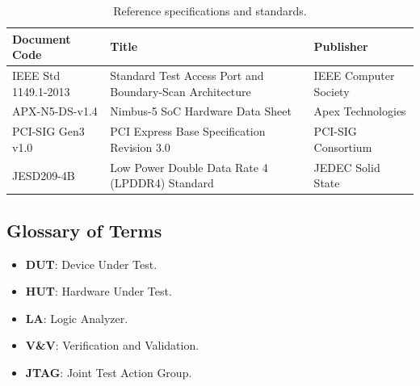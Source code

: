 \begin{table}[h]
\small
\centering
\begin{tabularx}{\textwidth}{L{3.5cm} L{5.5cm} Y}
\toprule
\textbf{Document Code} & \textbf{Title} & \textbf{Publisher} \\
\midrule
IEEE Std 1149.1-2013 & Standard Test Access Port and Boundary-Scan Architecture & IEEE Computer Society \\
APX-N5-DS-v1.4 & Nimbus-5 SoC Hardware Data Sheet & Apex Technologies \\
PCI-SIG Gen3 v1.0 & PCI Express Base Specification Revision 3.0 & PCI-SIG Consortium \\
JESD209-4B & Low Power Double Data Rate 4 (LPDDR4) Standard & JEDEC Solid State \\
\bottomrule
\end{tabularx}
\caption{Reference specifications and standards.}
\label{tab:references}
\end{table}

\subsection{Glossary of Terms}
\begin{itemize}
    \item \textbf{DUT}: Device Under Test.
    \item \textbf{HUT}: Hardware Under Test.
    \item \textbf{LA}: Logic Analyzer.
    \item \textbf{V\&V}: Verification and Validation.
    \item \textbf{JTAG}: Joint Test Action Group.
\end{itemize}
